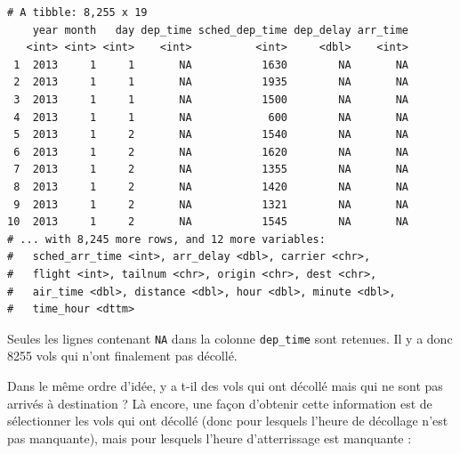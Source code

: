 \documentclass[
  a4paper,
]{article}
\newenvironment{Shaded}{\begin{snugshade}}{\end{snugshade}}
\newcommand{\KeywordTok}[1]{\textcolor[rgb]{0.12,0.11,0.11}{\textbf{#1}}}
\newcommand{\NormalTok}[1]{\textcolor[rgb]{0.12,0.11,0.11}{#1}}
\newcommand{\OperatorTok}[1]{\textcolor[rgb]{0.12,0.11,0.11}{#1}}
\newcommand{\StringTok}[1]{\textcolor[rgb]{0.75,0.01,0.01}{#1}}
\begin{document}
\begin{verbatim}
# A tibble: 8,255 x 19
    year month   day dep_time sched_dep_time dep_delay arr_time
   <int> <int> <int>    <int>          <int>     <dbl>    <int>
 1  2013     1     1       NA           1630        NA       NA
 2  2013     1     1       NA           1935        NA       NA
 3  2013     1     1       NA           1500        NA       NA
 4  2013     1     1       NA            600        NA       NA
 5  2013     1     2       NA           1540        NA       NA
 6  2013     1     2       NA           1620        NA       NA
 7  2013     1     2       NA           1355        NA       NA
 8  2013     1     2       NA           1420        NA       NA
 9  2013     1     2       NA           1321        NA       NA
10  2013     1     2       NA           1545        NA       NA
# ... with 8,245 more rows, and 12 more variables:
#   sched_arr_time <int>, arr_delay <dbl>, carrier <chr>,
#   flight <int>, tailnum <chr>, origin <chr>, dest <chr>,
#   air_time <dbl>, distance <dbl>, hour <dbl>, minute <dbl>,
#   time_hour <dttm>
\end{verbatim}

Seules les lignes contenant \texttt{NA} dans la colonne \texttt{dep\_time} sont retenues. Il y a donc 8255 vols qui n'ont finalement pas décollé.

Dans le même ordre d'idée, y a t-il des vols qui ont décollé mais qui ne sont pas arrivés à destination ? Là encore, une façon d'obtenir cette information est de sélectionner les vols qui ont décollé (donc pour lesquels l'heure de décollage n'est pas manquante), mais pour lesquels l'heure d'atterrissage est manquante :

\begin{Shaded}
\end{Shaded}
\end{document}
